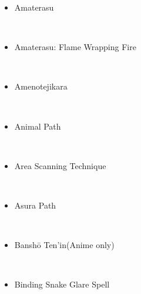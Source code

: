 \documentclass[a4paper,12pt]{article}
\begin{document}
\begin{itemize}
\item Amaterasu
\end{itemize}\\ \par \vspace{0.5cm}

\begin{itemize}
\item Amaterasu: Flame Wrapping Fire
\end{itemize}\\ \par \vspace{0.5cm}

\begin{itemize}
\item Amenotejikara
\end{itemize}\\ \par \vspace{0.5cm}

\begin{itemize}
\item Animal Path
\end{itemize}\\ \par \vspace{0.5cm}

\begin{itemize}
\item Area Scanning Technique
\end{itemize}\\ \par \vspace{0.5cm}

\begin{itemize}
\item Asura Path
\end{itemize}\\ \par \vspace{0.5cm}

\begin{itemize}
\item Banshō Ten'in(Anime only)
\end{itemize}\\ \par \vspace{0.5cm}

\begin{itemize}
\item Binding Snake Glare Spell
\end{itemize}\\ \par \vspace{0.5cm}
\end{document}
